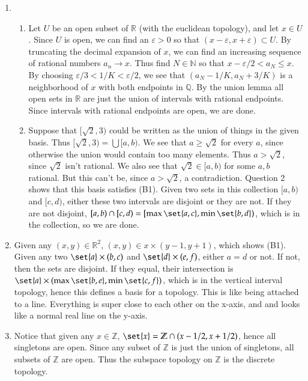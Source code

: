 \documentclass[12pt]{article}
\theoremstyle{definitionstyle}
\def\mbb#1{\mathbb{#1}}
\def\bN{\mbb{N}}
\def \R{\mbb{R}}
\def\bQ{\mbb{Q}}
\def\bZ{\mbb{Z}}
\def \ve{\varepsilon}
\begin{document}
\begin{enumerate}[leftmargin=\labelsep]
		\item \begin{enumerate}
			\item Let $U$ be an open subset of $\R$ (with the euclidean topology), and let $x \in U$. Since $U$ is open, we can find an $\ve > 0$ so that $(x-\ve, x + \ve) \subset U$. By truncating the decimal expansion of $x$, we can find an increasing sequence of rational numbers $a_n \to x$. Thus find $N \in \bN$ so that $x - \ve/2 < a_N \leq x$. By choosing $\ve/3 < 1/K < \ve/2$, we see that $(a_N - 1/K, a_N + 3/K)$ is a neighborhood of $x$ with both endpoints in $\bQ$. By the union lemma all open sets in $\R$ are just the union of intervals with rational endpoints. Since intervals with rational endpoints are open, we are done.
			
			\item Suppose that $[\sqrt{2}, 3)$ could be written as the union of things in the given basis. Thus $[\sqrt{2}, 3) = \bigcup [a, b)$. We see that $a \geq \sqrt{2}$ for every $a$, since otherwise the union would contain too many elements. Thus $a > \sqrt{2}$, since $\sqrt{2}$ isn't rational. We also see that $\sqrt{2} \in [a, b)$ for some $a, b$ rational. But this can't be, since $a > \sqrt{2}$, a contradiction. Question 2 shows that this basis satisfies (B1). Given two sets in this collection $[a, b)$ and $[c, d)$, either these two intervals are disjoint or they are not. If they are not disjoint, $[a, b) \cap [c, d) = [\max\set{a, c}, \min\set{b, d})$, which is in the collection, so we are done.
		\end{enumerate}
	
		\item Given any $(x, y) \in \R^2$, $(x, y) \in {x} \times (y-1, y+1)$, which shows (B1). Given any two $\set{a} \times (b, c)$ and $\set{d} \times (e, f)$, either $a = d$ or not. If not, then the sets are disjoint. If they equal, their intersection is $\set{a} \times (\max\set{b, e}, \min\set{c, f})$, which is in the vertical interval topology, hence this defines a basis for a topology. This is like being attached to a line. Everything is super close to each other on the x-axis, and and looks like a normal real line on the y-axis. 
		
		\item Notice that given any $x \in \bZ$, $\set{x} = \bZ \cap (x-1/2, x+1/2)$, hence all singletons are open. Since any subset of $\bZ$ is just the union of singletons, all subsets of $\bZ$ are open. Thus the subspace topology on $\bZ$ is the discrete topology.
		

\end{enumerate}
\end{document}

